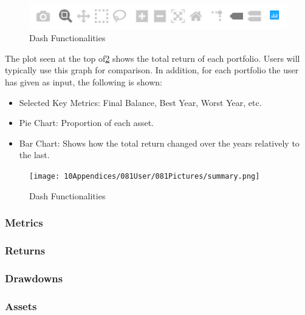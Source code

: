 \documentclass[main.tex]{subfiles}
\begin{document}
\begin{figure}[H]
   \centering
   \includegraphics[width=\textwidth]{10Appendices/081User/081Pictures/dash_funcionalities.png}
   \caption{Dash Functionalities}
   \label{dash_functionalities}
\end{figure}

The plot seen at the top of\figurename{\ref{summary}} shows the total return of each portfolio. Users will typically use this graph for comparison. In addition, for each portfolio the user has given as input, the following is shown:
\begin{itemize}
    \item Selected Key Metrics: Final Balance, Best Year, Worst Year, etc.
    \item Pie Chart: Proportion of each asset.
    \item Bar Chart: Shows how the total return changed over the years relatively to the last.
\end{itemize}

\begin{figure}[H]
   \centering
   \texttt{[image: 10Appendices/081User/081Pictures/summary.png]}
   \caption{Dash Functionalities}
   \label{summary}
\end{figure}


\subsubsection*{Metrics}
\subsubsection*{Returns}
\subsubsection*{Drawdowns}
\subsubsection*{Assets}
\end{document}
